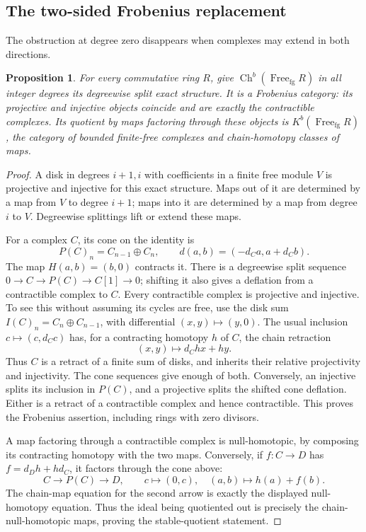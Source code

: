 \documentclass[11pt,a4paper]{article}
\newtheorem{proposition}[theorem]{Proposition}
\theoremstyle{definition}
\begin{document}
\subsection{The two-sided Frobenius replacement}
The obstruction at degree zero disappears when complexes may extend
in both directions.
\begin{proposition}\label{prop:frobenius}
For every commutative ring $R$, give
$\operatorname{Ch}^b(\operatorname{Free}_{\mathrm{fg}}R)$ in all
integer degrees its degreewise split exact structure. It is a
Frobenius category: its projective and injective objects coincide
and are exactly the contractible complexes. Its quotient by maps
factoring through these objects is
$K^b(\operatorname{Free}_{\mathrm{fg}}R)$, the category of bounded
finite-free complexes and chain-homotopy classes of maps.
\end{proposition}
\begin{proof}
A disk in degrees $i+1,i$ with coefficients in a finite free module
$V$ is projective and injective for this exact structure. Maps out
of it are determined by a map from $V$ to degree $i+1$; maps into
it are determined by a map from degree $i$ to $V$. Degreewise
splittings lift or extend these maps.

For a complex $C$, its cone on the identity is
\[
 P(C)_n=C_{n-1}\oplus C_n,\qquad
 d(a,b)=(-d_Ca,a+d_Cb).
\]
The map $H(a,b)=(b,0)$ contracts it. There is a degreewise split
sequence $0\to C\to P(C)\to C[1]\to0$; shifting it also gives
a deflation from a contractible complex to $C$. Every contractible
complex is projective and injective. To see this without assuming
its cycles are free, use the disk sum
$I(C)_n=C_n\oplus C_{n-1}$, with differential $(x,y)\mapsto(y,0)$.
The usual inclusion $c\mapsto(c,d_Cc)$ has, for a contracting
homotopy $h$ of $C$, the chain retraction
\[
 (x,y)\longmapsto d_Chx+hy.
\]
Thus $C$ is a retract of a finite sum of disks, and inherits their
relative projectivity and injectivity. The cone sequences give enough
of both. Conversely, an injective splits its inclusion in $P(C)$,
and a projective splits the shifted cone deflation. Either is a
retract of a contractible complex and hence contractible. This proves
the Frobenius assertion, including rings with zero divisors.

A map factoring through a contractible complex is null-homotopic,
by composing its contracting homotopy with the two maps. Conversely,
if $f:C\to D$ has $f=d_Dh+hd_C$, it factors through the cone above:
\[
 C\longrightarrow P(C)\longrightarrow D,\qquad
 c\longmapsto(0,c),\quad (a,b)\longmapsto h(a)+f(b).
\]
The chain-map equation for the second arrow is exactly the displayed
null-homotopy equation. Thus the ideal being quotiented out is
precisely the chain-null-homotopic maps, proving the stable-quotient
statement.
\end{proof}
\end{document}
